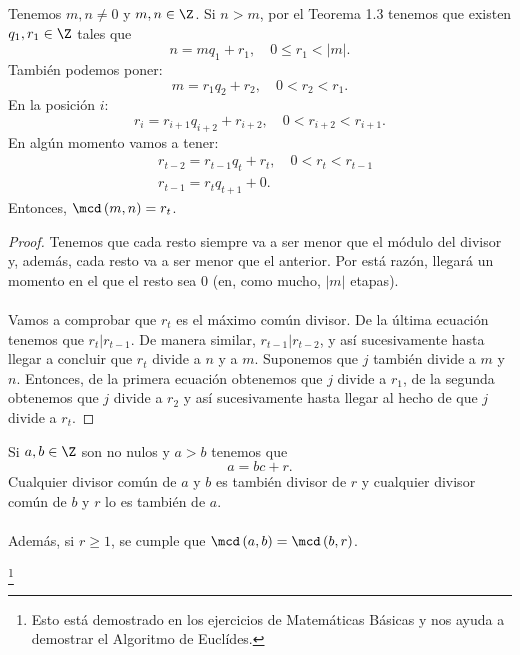  \begin{ftheorem}
 \normalfont Tenemos $\displaystyle m,n \neq 0 $ y $\displaystyle m,n \in \Z $. Si $\displaystyle n>m $, por el Teorema 1.3 tenemos que existen $\displaystyle q_{1},r_{1}\in\Z $ tales que
 \[n = mq_{1}+r_{1}, \quad 0 \leq r_{1}< \left|m\right| .\]
 También podemos poner:
 \[m = r_{1}q_{2}+r_{2}, \quad 0<r_{2}<r_{1} .\]
 En la posición $\displaystyle i $:
 \[ r_{i} = r_{i+1}q_{i+2}+r_{i+2}, \quad 0<r_{i+2}<r_{i+1}.\]
 En algún momento vamos a tener:
 \[
 \begin{split}
 & r_{t-2}=r_{t-1}q_{t}+r_{t}, \quad 0<r_{t}<r_{t-1} \\
 & r_{t-1} = r_{t}q_{t+1}+0.
 \end{split}
 \]
 Entonces, $\displaystyle \mcd\left(m,n\right)=r_{t} $. 
 \end{ftheorem} 

 \begin{proof}
Tenemos que cada resto siempre va a ser menor que el módulo del divisor y, además, cada resto va a ser menor que el anterior. Por está razón, llegará un momento en el que el resto sea 0 (en, como mucho, $\displaystyle \left|m\right| $ etapas). \\ \\
Vamos a comprobar que $\displaystyle r_{t} $ es el máximo común divisor. De la última ecuación tenemos que $\displaystyle r_{t}|r_{t-1} $. De manera similar, $\displaystyle r_{t-1}|r_{t-2} $, y así sucesivamente hasta llegar a concluir que $\displaystyle r_{t} $ divide a $\displaystyle n $ y a $\displaystyle m $. Suponemos que $\displaystyle j $ también divide a $\displaystyle m $ y $\displaystyle n $. Entonces, de la primera ecuación obtenemos que $\displaystyle j $ divide a $\displaystyle r_{1} $, de la segunda obtenemos que $\displaystyle j $ divide a $\displaystyle r_{2} $ y así sucesivamente hasta llegar al hecho de que $\displaystyle j $ divide a $\displaystyle r_{t} $.
 \end{proof}

 \begin{flema}[]
 \normalfont Si $\displaystyle a,b \in \Z $ son no nulos y $\displaystyle a > b $ tenemos que
 \[a = b c + r .\]
 Cualquier divisor común de $\displaystyle a $ y $\displaystyle b $ es también divisor de $\displaystyle r $ y cualquier divisor común de $\displaystyle b $ y $\displaystyle r $ lo es también de $\displaystyle a $. \\ \\
 Además, si $\displaystyle r \geq 1 $, se cumple que $\displaystyle \mcd\left(a,b\right) = \mcd\left(b,r\right) $.
 \end{flema}
 \footnote{Esto está demostrado en los ejercicios de Matemáticas Básicas y nos ayuda a demostrar el Algoritmo de Euclídes.} 

